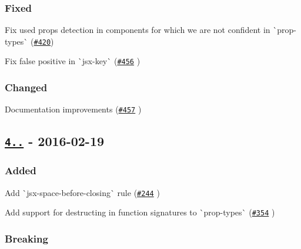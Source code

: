 \subsubsection*{Fixed}


\begin{DoxyItemize}
\item Fix used props detection in components for which we are not confident in \`{}prop-\/types\`{} (\href{https://github.com/yannickcr/eslint-plugin-react/issues/420}{\tt \#420})
\item Fix false positive in \`{}jsx-\/key\`{} (\href{https://github.com/yannickcr/eslint-plugin-react/pull/456}{\tt \#456} )
\end{DoxyItemize}

\subsubsection*{Changed}


\begin{DoxyItemize}
\item Documentation improvements (\href{https://github.com/yannickcr/eslint-plugin-react/pull/457}{\tt \#457} )
\end{DoxyItemize}

\subsection*{\href{https://github.com/yannickcr/eslint-plugin-react/compare/v3.16.1...v4.0.0}{\tt 4..} -\/ 2016-\/02-\/19}

\subsubsection*{Added}


\begin{DoxyItemize}
\item Add \`{}jsx-\/space-\/before-\/closing\`{} rule (\href{https://github.com/yannickcr/eslint-plugin-react/issues/244}{\tt \#244} )
\item Add support for destructing in function signatures to \`{}prop-\/types\`{} (\href{https://github.com/yannickcr/eslint-plugin-react/issues/354}{\tt \#354} )
\end{DoxyItemize}

\subsubsection*{Breaking}


